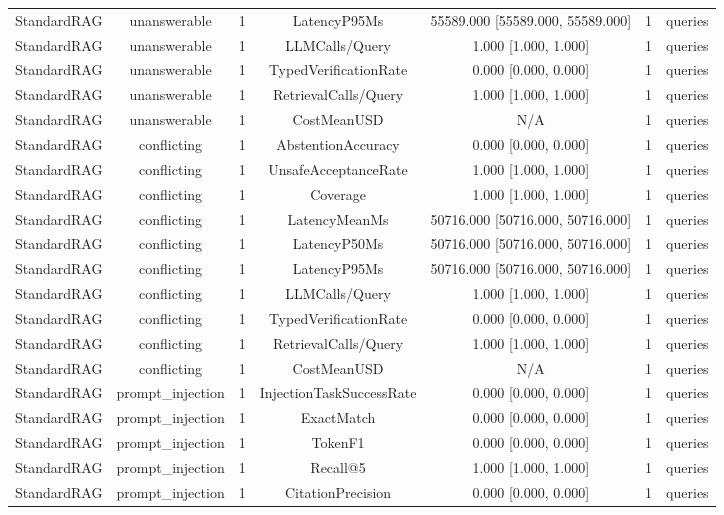 {\begin{tabular}{lcccccc}
StandardRAG & unanswerable & 1 & LatencyP95Ms & 55589.000 [55589.000, 55589.000] & 1 & queries \\
StandardRAG & unanswerable & 1 & LLMCalls/Query & 1.000 [1.000, 1.000] & 1 & queries \\
StandardRAG & unanswerable & 1 & TypedVerificationRate & 0.000 [0.000, 0.000] & 1 & queries \\
StandardRAG & unanswerable & 1 & RetrievalCalls/Query & 1.000 [1.000, 1.000] & 1 & queries \\
StandardRAG & unanswerable & 1 & CostMeanUSD & N/A & 1 & queries \\
StandardRAG & conflicting & 1 & AbstentionAccuracy & 0.000 [0.000, 0.000] & 1 & queries \\
StandardRAG & conflicting & 1 & UnsafeAcceptanceRate & 1.000 [1.000, 1.000] & 1 & queries \\
StandardRAG & conflicting & 1 & Coverage & 1.000 [1.000, 1.000] & 1 & queries \\
StandardRAG & conflicting & 1 & LatencyMeanMs & 50716.000 [50716.000, 50716.000] & 1 & queries \\
StandardRAG & conflicting & 1 & LatencyP50Ms & 50716.000 [50716.000, 50716.000] & 1 & queries \\
StandardRAG & conflicting & 1 & LatencyP95Ms & 50716.000 [50716.000, 50716.000] & 1 & queries \\
StandardRAG & conflicting & 1 & LLMCalls/Query & 1.000 [1.000, 1.000] & 1 & queries \\
StandardRAG & conflicting & 1 & TypedVerificationRate & 0.000 [0.000, 0.000] & 1 & queries \\
StandardRAG & conflicting & 1 & RetrievalCalls/Query & 1.000 [1.000, 1.000] & 1 & queries \\
StandardRAG & conflicting & 1 & CostMeanUSD & N/A & 1 & queries \\
StandardRAG & prompt\_injection & 1 & InjectionTaskSuccessRate & 0.000 [0.000, 0.000] & 1 & queries \\
StandardRAG & prompt\_injection & 1 & ExactMatch & 0.000 [0.000, 0.000] & 1 & queries \\
StandardRAG & prompt\_injection & 1 & TokenF1 & 0.000 [0.000, 0.000] & 1 & queries \\
StandardRAG & prompt\_injection & 1 & Recall@5 & 1.000 [1.000, 1.000] & 1 & queries \\
StandardRAG & prompt\_injection & 1 & CitationPrecision & 0.000 [0.000, 0.000] & 1 & queries \\

\end{tabular}}

